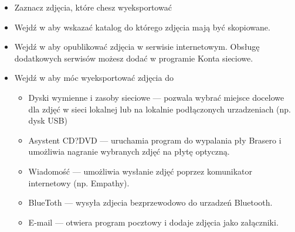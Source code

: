 \begin{itemize}
\item Zaznacz zdjęcia, które chesz wyeksportować
\item Wejdź w  aby wskazać katalog do którego zdjęcia mają być skopiowane.
\item Wejdź w  aby opublikować zdjęcia w serwisie internetowym. Obsługę dodatkowych serwisów możesz dodać w programie \textcolor{ubuntu_orange}{Konta sieciowe}.
\item Wejdź w  aby móc wyeksportować zdjęcia do
	\begin{itemize}
	\item \textcolor{ubuntu_orange}{Dyski wymienne i zasoby sieciowe} --- pozwala wybrać miejsce docelowe dla zdjęć w sieci lokalnej lub na lokalnie podłączonych urzadzeniach (np. dysk USB)
	\item \textcolor{ubuntu_orange}{Asystent CD?DVD} --- uruchamia program do wypalania pły Brasero i umożliwia nagranie wybranych zdjęć na płytę optyczną.
	\item \textcolor{ubuntu_orange}{Wiadomość} --- umożliwia wysłanie zdjęć poprzez komunikator internetowy (np. Empathy).
	\item \textcolor{ubuntu_orange}{BlueToth} --- wysyła zdjecia bezprzewodowo do urzadzeń Bluetooth.
	\item \textcolor{ubuntu_orange}{E-mail} --- otwiera program pocztowy i dodaje zdjęcia jako załączniki.
	\end{itemize}	
\end{itemize}
